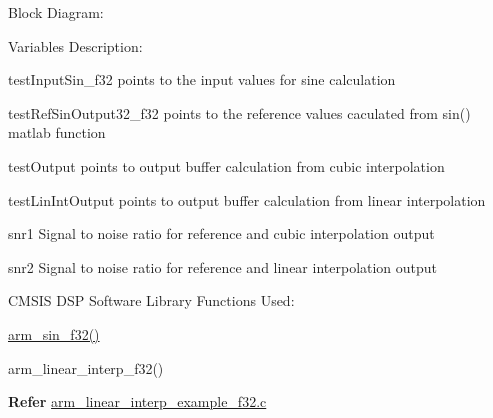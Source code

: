 \begin{DoxyParagraph}{Block Diagram\-:}

\end{DoxyParagraph}
\begin{DoxyParagraph}{}

\end{DoxyParagraph}
\begin{DoxyParagraph}{}
 
\end{DoxyParagraph}
\begin{DoxyParagraph}{Variables Description\-:}

\end{DoxyParagraph}
\begin{DoxyParagraph}{}
\begin{DoxyItemize}
\item {\ttfamily test\-Input\-Sin\-\_\-f32} points to the input values for sine calculation \item {\ttfamily test\-Ref\-Sin\-Output32\-\_\-f32} points to the reference values caculated from sin() matlab function \item {\ttfamily test\-Output} points to output buffer calculation from cubic interpolation \item {\ttfamily test\-Lin\-Int\-Output} points to output buffer calculation from linear interpolation \item {\ttfamily snr1} Signal to noise ratio for reference and cubic interpolation output \item {\ttfamily snr2} Signal to noise ratio for reference and linear interpolation output\end{DoxyItemize}

\end{DoxyParagraph}
\begin{DoxyParagraph}{C\-M\-S\-I\-S D\-S\-P Software Library Functions Used\-:}

\end{DoxyParagraph}
\begin{DoxyParagraph}{}

\begin{DoxyItemize}
\item \hyperlink{group__sin_gae164899c4a3fc0e946dc5d55555fe541}{arm\-\_\-sin\-\_\-f32()}
\item arm\-\_\-linear\-\_\-interp\-\_\-f32()
\end{DoxyItemize}
\end{DoxyParagraph}
{\bfseries  Refer } \hyperlink{arm_linear_interp_example_f32_8c-example}{arm\-\_\-linear\-\_\-interp\-\_\-example\-\_\-f32.\-c} 